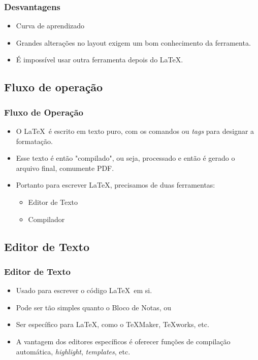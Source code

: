 \documentclass[10pt]{beamer}
\begin{document}
\begin{frame}
  \frametitle{Desvantagens}
  \begin{itemize}
    \item{Curva de aprendizado}
    \item{Grandes alterações no layout exigem um bom conhecimento da ferramenta.}
    \item{É impossível usar outra ferramenta depois do \LaTeX.}
  \end{itemize}
\end{frame}

\subsection{Fluxo de operação}
\begin{frame}
  \frametitle{Fluxo de Operação}
  \begin{itemize}
    \item O \LaTeX\ é escrito em texto puro, com os comandos ou \textit{tags} para designar a formatação.
    \item Esse texto é então "compilado", ou seja, processado e então é gerado o arquivo final, comumente PDF.
    \item Portanto para escrever \LaTeX, precisamos de duas ferramentas:
      \begin{itemize}
        \item Editor de Texto
        \item Compilador
      \end{itemize}
  \end{itemize}
\end{frame}

\subsection{Editor de Texto}
\begin{frame}
  \frametitle{Editor de Texto}
  \begin{itemize}
    \item Usado para escrever o código \LaTeX\ em si.
    \item Pode ser tão simples quanto o Bloco de Notas, ou
    \item Ser específico para \LaTeX, como o \TeX Maker, \TeX works, etc.
    \item A vantagem dos editores específicos é oferecer funções de compilação automática, \textit{highlight}, \textit{templates}, etc.
  \end{itemize}
\end{frame}
\end{document}
